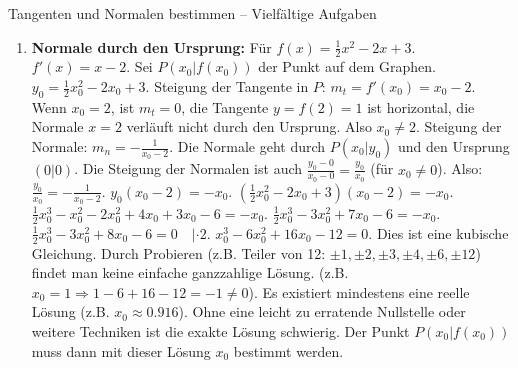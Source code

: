 \begin{loesungsumgebung}{Tangenten und Normalen bestimmen – Vielfältige Aufgaben}
\begin{enumerate}[label=(\alph*)]
    \item \textbf{Normale durch den Ursprung:}
    Für $f(x) = \frac{1}{2}x^2 - 2x + 3$. $f'(x) = x - 2$.
    Sei $P(x_0|f(x_0))$ der Punkt auf dem Graphen. $y_0 = \frac{1}{2}x_0^2 - 2x_0 + 3$.
    Steigung der Tangente in $P$: $m_t = f'(x_0) = x_0 - 2$.
    Wenn $x_0=2$, ist $m_t=0$, die Tangente $y=f(2)=1$ ist horizontal, die Normale $x=2$ verläuft nicht durch den Ursprung. Also $x_0 \neq 2$.
    Steigung der Normale: $m_n = -\frac{1}{x_0-2}$.
    Die Normale geht durch $P(x_0|y_0)$ und den Ursprung $(0|0)$. Die Steigung der Normalen ist auch $\frac{y_0-0}{x_0-0} = \frac{y_0}{x_0}$ (für $x_0 \neq 0$).
    Also: $\frac{y_0}{x_0} = -\frac{1}{x_0-2}$.
    $y_0(x_0-2) = -x_0$.
    $(\frac{1}{2}x_0^2 - 2x_0 + 3)(x_0-2) = -x_0$.
    $\frac{1}{2}x_0^3 - x_0^2 - 2x_0^2 + 4x_0 + 3x_0 - 6 = -x_0$.
    $\frac{1}{2}x_0^3 - 3x_0^2 + 7x_0 - 6 = -x_0$.
    $\frac{1}{2}x_0^3 - 3x_0^2 + 8x_0 - 6 = 0 \quad | \cdot 2$.
    $x_0^3 - 6x_0^2 + 16x_0 - 12 = 0$.
    Dies ist eine kubische Gleichung. Durch Probieren (z.B. Teiler von 12: $\pm 1, \pm 2, \pm 3, \pm 4, \pm 6, \pm 12$) findet man keine einfache ganzzahlige Lösung. (z.B. $x_0=1 \Rightarrow 1-6+16-12 = -1 \neq 0$). Es existiert mindestens eine reelle Lösung (z.B. $x_0 \approx 0.916$). Ohne eine leicht zu erratende Nullstelle oder weitere Techniken ist die exakte Lösung schwierig. Der Punkt $P(x_0|f(x_0))$ muss dann mit dieser Lösung $x_0$ bestimmt werden.


\end{enumerate}
\end{loesungsumgebung}
